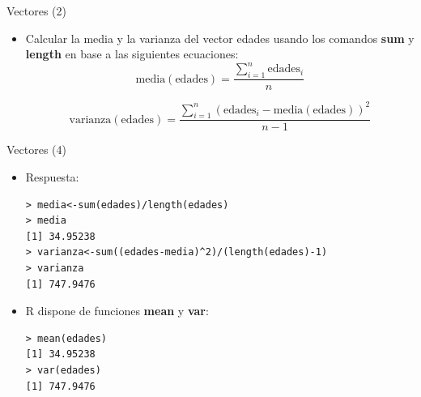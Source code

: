 \documentclass[handout]{beamer}
\begin{document}
\begin{frame}[fragile]{Vectores (2)}
\scriptsize{
\begin{itemize}
 \item Calcular la media y la varianza del vector edades usando los comandos \textbf{sum} y \textbf{length} en base a las siguientes ecuaciones:
 \begin{equation}
  \text{media}(\text{edades})=\frac{\sum_{i=1}^n\text{edades}_{i}}{n}
 \end{equation}
 
 \begin{equation}
 \text{varianza}(\text{edades})=\frac{\sum_{i=1}^n(\text{edades}_{i}-\text{media}(\text{edades}))^2 }{n-1} 
 \end{equation}

 
\end{itemize}



}

 
\end{frame}



\begin{frame}[fragile]{Vectores (4)}
\scriptsize{
\begin{itemize}
 \item Respuesta:
 \begin{verbatim}
> media<-sum(edades)/length(edades)
> media
[1] 34.95238
> varianza<-sum((edades-media)^2)/(length(edades)-1)
> varianza
[1] 747.9476
 \end{verbatim}
 
 \item R dispone de funciones \textbf{mean} y \textbf{var}:
 \begin{verbatim}
> mean(edades)
[1] 34.95238
> var(edades)
[1] 747.9476

 \end{verbatim}
 
\end{itemize}



}

 
\end{frame}
 
\end{document}
